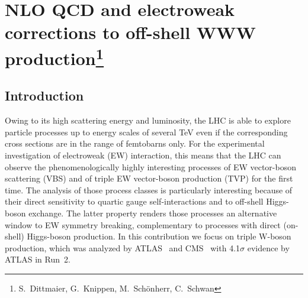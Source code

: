 \newcommand{\Herwig}{H\protect\scalebox{0.8}{ERWIG}\xspace}
\newcommand{\Pythia}{P\protect\scalebox{0.8}{YTHIA}\xspace}
\newcommand{\Sherpa}{S\protect\scalebox{0.8}{HERPA}\xspace}
\newcommand{\Rivet}{R\protect\scalebox{0.8}{IVET}\xspace}
\newcommand{\Recola}{R\protect\scalebox{0.8}{ECOLA}\xspace}
\newcommand{\Amegic}{A\protect\scalebox{0.8}{MEGIC}\xspace}
\newcommand{\Professor}{P\protect\scalebox{0.8}{ROFESSOR}\xspace}
\newcommand{\OpenLoops}{O\protect\scalebox{0.8}{PENLOOPS 2}\xspace}
\newcommand{\Collier}{C\protect\scalebox{0.8}{OLLIER}\xspace}
\newcommand{\Madgraph}{M\protect\scalebox{0.8}{G5\_aMC@NLO}\xspace}
\newcommand{\eps}{\varepsilon}
\newcommand{\mc}[1]{\mathcal{#1}}
\newcommand{\mr}[1]{\mathrm{#1}}
\newcommand{\mb}[1]{\mathbb{#1}}
\newcommand{\tm}[1]{\scalebox{0.95}{$#1$}}
\newcommand{\vp}{\ensuremath{\vphantom{\int_a^b}}}
\newcommand{\vP}{\ensuremath{\vphantom{\int\limits_a^b}}}

\section{NLO QCD and electroweak corrections to off-shell WWW production\protect\footnote{
  S.~Dittmaier,
  G.~Knippen,
  M.~Sch{\"o}nherr,
  C.~Schwan}{}}

\label{sec:WWW}


\subsection{Introduction}
\label{sec:WWW:intro}

Owing to its high scattering energy and luminosity, the LHC is able 
to explore particle processes up to energy scales of several TeV 
even if the corresponding cross sections are in the range of
femtobarns only. 
For the experimental investigation of electroweak (EW) interaction,
this means that the LHC can observe the phenomenologically highly
interesting processes of EW vector-boson scattering (VBS) and
of triple EW vector-boson production (TVP) for the first time.
The analysis of those process classes is particularly interesting
because of their direct sensitivity to quartic gauge self-interactions
and to off-shell Higgs-boson exchange. The latter property renders
those processes an alternative window to EW symmetry
breaking, complementary to processes with direct (on-shell)
Higgs-boson production.
In this contribution we focus on triple W-boson production, which
was analyzed by ATLAS~\cite{Aaboud:2016ftt,Aad:2019dxu}
and CMS~\cite{CMS:2019mpq} with 4.1$\sigma$ evidence by ATLAS in Run~2.

